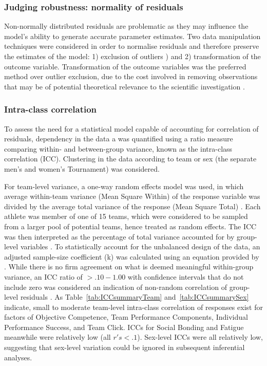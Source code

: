 \begin{CJK}{UTF8}{gbsn}
\subsubsection{Judging robustness: normality of residuals\label{app8:normality}}
Non-normally distributed residuals are problematic as they may influence the model's ability to generate accurate parameter estimates. Two data manipulation techniques were considered in order to normalise residuals and therefore preserve the estimates of the model: 1) exclusion of outliers \citep[according to Tukey's method; observations above and below 1.5x the Inter Quartile Range (IQR); see][]{Tukey1977}) and 2) transformation of the outcome variable.  Transformation of the outcome variables was the preferred method over outlier exclusion, due to the cost involved in removing observations that may be of potential theoretical relevance to the scientific investigation \citep{Rousseeuw2011}.

\subsubsection{Intra-class correlation\label{app8:ICC}}
To assess the need for a statistical model capable of accounting for correlation of residuals, dependency in the data a was quantified using a ratio measure comparing within- and between-group variance, known as the intra-class correlation (ICC). Clustering in the data according to team or sex (the separate men's and women's Tournament) was considered.

For team-level variance, a one-way random effects model was used, in which average within-team variance (Mean Square Within) of the response variable was divided by the average total variance of the response (Mean Square Total) \citep{Field2005a}.  Each athlete was member of one of 15 teams, which were considered to be sampled from a larger pool of potential teams, hence treated as random effects. The ICC was then interpreted as the percentage of total variance accounted for by group-level variables \citep{Wolak2012}.
To statistically account for the unbalanced design of the data, an adjusted sample-size coefficient (k) was calculated using an equation provided by \citep{Lessells1987}.  While there is no firm agreement on what is deemed meaningful within-group variance, an ICC ratio of $>.10-1.00$ with confidence intervals that do not include zero was considered an indication of non-random correlation of group-level residuals \citep{Bailey2011}. As Table~\ref{tab:ICCsummaryTeam} and~\ref{tab:ICCsummarySex} indicate, small to moderate team-level intra-class correlation of responses exist for factors of Objective Competence, Team Performance Components, Individual Performance Success, and Team Click.  ICCs for Social Bonding and Fatigue meanwhile were relatively low (all $r's <.1$). Sex-level ICCs were all relatively low, suggesting that sex-level variation could be ignored in subsequent inferential analyses.\\


\end{CJK}
